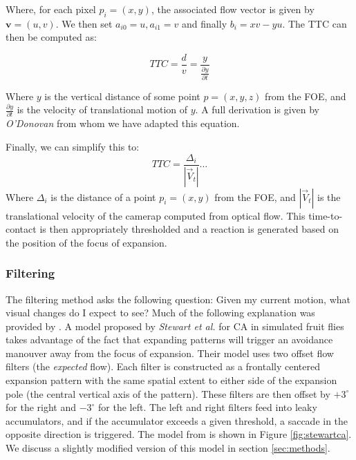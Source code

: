 \documentclass[a4paper,12pt]{article}
\begin{document}
Where, for each pixel $p_i = (x, y)$, the associated flow vector is given by $\mathbf{v} = (u, v)$.
We then set $a_{i0} = u, a_{i1} = v$ and finally $b_i = xv - yu$. The TTC can then be computed as:

\begin{equation}
  TTC = \frac{d}{v} = \frac{y}{\frac{\partial y}{\partial t}}
\end{equation}

Where $y$ is the vertical distance of some point $p = (x,y,z)$ from the
FOE, and $\frac{\partial y}{\partial t}$ is the velocity of translational motion of $y$.
A full derivation is given by \textit{O'Donovan} from whom we have adapted this equation.

Finally, we can simplify this to:
\begin{equation}
TTC = \frac{\Delta_i}{|\vec{V}_t|} \dots
\end{equation}
Where $\Delta_i$ is the distance of a point $p_i = (x,y)$ from the FOE, and $|\vec{V}_t|$ is the
translational velocity of the camerap computed from optical flow\cite{Souhila2007}.
\newline
This time-to-contact is then appropriately thresholded and a reaction is generated based on the
position of the focus of expansion.

\subsubsection{ Filtering }
The filtering method asks the following question: Given my current motion, what visual changes do
I expect to see? Much of the following explanation was provided by \cite{Stewart2010}.
A model proposed by \textit{Stewart et al.} for CA in simulated fruit flies takes
advantage of the fact that expanding patterns will trigger an avoidance manouver away from the focus
of expansion\cite{Stewart2010}. Their model uses two offset flow filters (the \textit{expected}
flow). Each filter is constructed as a frontally centered expansion pattern with the same spatial
extent to either side of the expansion pole (the central vertical axis of the pattern). These filters
are then offset by $+3^{\circ}$ for the right and $-3^{\circ}$ for the left. The left and right
filters feed into leaky accumulators, and if the accumulator exceeds a given threshold, a saccade
in the opposite direction is triggered. The model from \cite{Stewart2010} is shown in Figure
\ref{fig:stewartca}. We discuss a slightly modified version of this model in section
\ref{sec:methods}.
\end{document}
